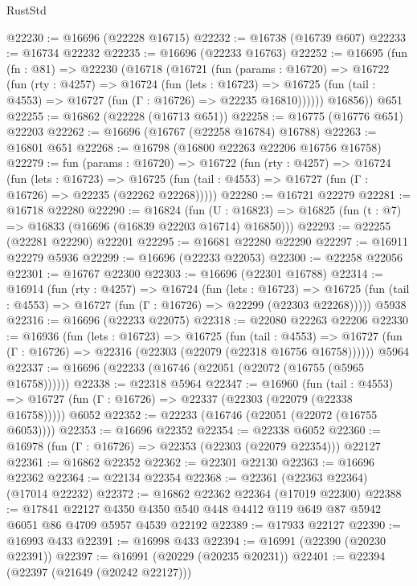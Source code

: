 \begin{lexlean}{RustStd}
\begin{coremodule}
@22230 := @16696 (@22228 @16715)
@22232 := @16738 (@16739 @607)
@22233 := @16734 @22232
@22235 := @16696 (@22233 @16763)
@22252 := @16695
    (fun (fn : @81) =>
    @22230
      (@16718
        (@16721
          (fun (params : @16720) =>
          @16722
            (fun (rty : @4257) =>
            @16724
              (fun (lets : @16723) =>
              @16725 (fun (tail : @4553) => @16727 (fun (Γ : @16726) => @22235 @16810))))))
        @16856))
    @651
@22255 := @16862 (@22228 (@16713 @651))
@22258 := @16775 (@16776 @651) @22203
@22262 := @16696 (@16767 (@22258 @16784) @16788)
@22263 := @16801 @651
@22268 := @16798 (@16800 @22263 @22206 @16756 @16758)
@22279 := fun (params : @16720) =>
  @16722
    (fun (rty : @4257) =>
    @16724
      (fun (lets : @16723) =>
      @16725 (fun (tail : @4553) => @16727 (fun (Γ : @16726) => @22235 (@22262 @22268)))))
@22280 := @16721 @22279
@22281 := @16718 @22280
@22290 := @16824
    (fun (U : @16823) => @16825 (fun (t : @7) => @16833 (@16696 (@16839 @22203 @16714) @16850)))
@22293 := @22255 (@22281 @22290) @22201
@22295 := @16681 @22280 @22290
@22297 := @16911 @22279 @5936
@22299 := @16696 (@22233 @22053)
@22300 := @22258 @22056
@22301 := @16767 @22300
@22303 := @16696 (@22301 @16788)
@22314 := @16914
    (fun (rty : @4257) =>
    @16724
      (fun (lets : @16723) =>
      @16725 (fun (tail : @4553) => @16727 (fun (Γ : @16726) => @22299 (@22303 @22268)))))
    @5938
@22316 := @16696 (@22233 @22075)
@22318 := @22080 @22263 @22206
@22330 := @16936
    (fun (lets : @16723) =>
    @16725
      (fun (tail : @4553) =>
      @16727 (fun (Γ : @16726) => @22316 (@22303 (@22079 (@22318 @16756 @16758))))))
    @5964
@22337 := @16696 (@22233 (@16746 (@22051 (@22072 (@16755 (@5965 @16758))))))
@22338 := @22318 @5964
@22347 := @16960
    (fun (tail : @4553) => @16727 (fun (Γ : @16726) => @22337 (@22303 (@22079 (@22338 @16758)))))
    @6052
@22352 := @22233 (@16746 (@22051 (@22072 (@16755 @6053))))
@22353 := @16696 @22352
@22354 := @22338 @6052
@22360 := @16978 (fun (Γ : @16726) => @22353 (@22303 (@22079 @22354))) @22127
@22361 := @16862 @22352
@22362 := @22301 @22130
@22363 := @16696 @22362
@22364 := @22134 @22354
@22368 := @22361 (@22363 @22364) (@17014 @22232)
@22372 := @16862 @22362 @22364 (@17019 @22300)
@22388 := @17841
    @22127
    @4350
    @4350
    @540
    @448
    @4412
    @119
    @649
    @87
    @5942
    @6051
    @86
    @4709
    @5957
    @4539
    @22192
@22389 := @17933 @22127
@22390 := @16993 @433
@22391 := @16998 @433
@22394 := @16991 (@22390 (@20230 @22391))
@22397 := @16991 (@20229 (@20235 @20231))
@22401 := @22394 (@22397 (@21649 (@20242 @22127)))

\end{coremodule}
\end{lexlean}
